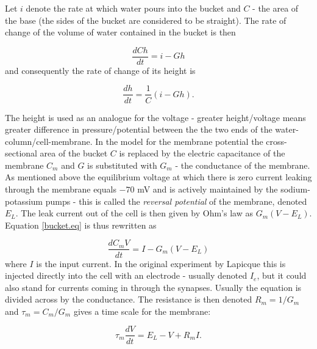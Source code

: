 \documentclass[12pt]{extarticle}
\begin{document}
\noindent
Let $i$ denote the rate at which water pours into the bucket and $C$ - the area of the base (the sides of the bucket are considered to be straight). The rate of change of the volume of water contained in the bucket is then

\begin{equation}
\frac{dCh}{dt} = i - Gh
\label{bucket.eq}
\end{equation}
and consequently the rate of change of its height is

\begin{equation}
\frac{dh}{dt} = \frac{1}{C}(i - Gh).
\end{equation}

\noindent
The height is used as an analogue for the voltage - greater height/voltage means greater difference in pressure/potential between the the two ends of the water-column/cell-membrane. In the model for the membrane potential the cross-sectional area of the bucket $C$ is replaced by the electric capacitance of the membrane $C_m$ and $G$ is substituted with $G_m$ - the conductance of the membrane. As mentioned above the equilibrium voltage at which there is zero current leaking through the membrane equals $-70$ mV and is actively maintained by the sodium-potassium pumps - this is called the \textit{reversal potential} of the membrane, denoted $E_L$. The leak current out of the cell is then given by Ohm's law as $G_m(V-E_L)$. Equation \ref{bucket.eq} is thus rewritten as

\begin{equation}
\frac{dC_mV}{dt} = I - G_m(V-E_L)
\end{equation}
where $I$ is the input current. In the original experiment by Lapicque \cite{Lapique} this is injected directly into the cell with an electrode - usually denoted $I_e$, but it could also stand for currents coming in through the synapses. Usually the equation is divided across by the conductance. The resistance is then denoted $R_m=1/G_m$ and $\tau_m=C_m/G_m$ gives a time scale for the membrane:

\begin{equation}
\tau_m\frac{dV}{dt} = E_L - V + R_mI.
\end{equation}
\end{document}
